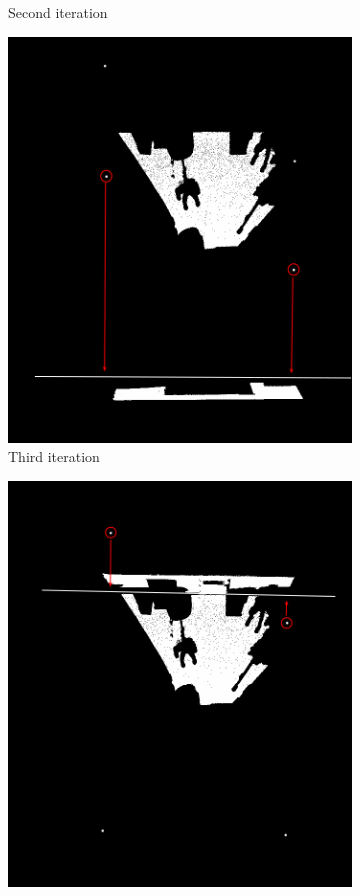 \begin{figure}[H]
\begin{subfigure}[b]{0.5\linewidth}
					\caption{Second iteration} 
					\label{fig4Adjust:b} 
					\vspace{4ex}
				\end{subfigure} 
				\begin{subfigure}[b]{0.5\linewidth}
					\centering
					\includegraphics[width=0.9\linewidth]{"Includes/images/Project Points/F-3"} 
					\caption{Third iteration} 
					\label{fig4Adjust:c} 
				\end{subfigure}%
				\begin{subfigure}[b]{0.5\linewidth}
					\centering
					\includegraphics[width=0.9\linewidth]{"Includes/images/Project Points/F-4"} 

\end{subfigure}
\end{figure}
